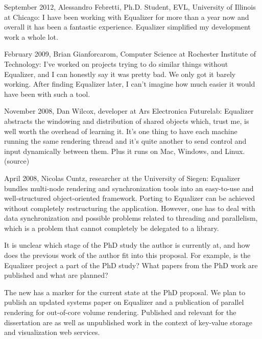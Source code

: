 \begin{compactdesc}
\item[September 2012, Alessandro Febretti, Ph.D. Student, EVL, University of Illinois at Chicago:] I have been working with Equalizer for more than a year now and overall it has been a fantastic experience. Equalizer simplified my development work a whole lot.
\item[February 2009, Brian Gianforcarom, Computer Science at Rochester Institute of Technology:] I've worked on projects trying to do similar things without Equalizer, and I can honestly say it was pretty bad. We only got it barely working. After finding Equalizer later, I can't imagine how much easier it would have been with such a tool.
\item[November 2008, Dan Wilcox, developer at Ars Electronica Futurelab:] Equalizer abstracts the windowing and distribution of shared objects which, trust me, is well worth the overhead of learning it. It's one thing to have each machine running the same rendering thread and it's quite another to send control and input dynamically between them. Plus it runs on Mac, Windows, and Linux. (source)
\item[April 2008, Nicolas Cuntz, researcher at the University of Siegen:]Equalizer bundles multi-node rendering and synchronization tools into an easy-to-use and well-structured object-oriented framework. Porting to Equalizer can be achieved without completely restructuring the application. However, one has to deal with data synchronization and possible problems related to threading and parallelism, which is a problem that cannot completely be delegated to a library.
\end{compactdesc}

\begin{displayquote} It is unclear which stage of the PhD study the author is
currently at, and how does the previous work of the author fit into this
proposal. For example, is the Equalizer project a part of the PhD study? What
papers from the PhD work are published and what are planned?
\end{displayquote}

The new  has a marker for the current state at the PhD proposal. We
plan to publish an updated systems paper on Equalizer and a publication of
parallel rendering for out-of-core volume rendering. Published and relevant for
the dissertation are \cite{EMP:09, EEP:11, EP:07, HBBES:13, EBAHMP:12, MEP:10}
as well as unpublished work in the context of key-value storage and
visualization web services.


